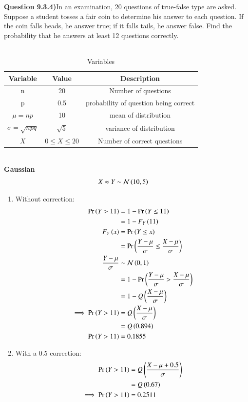 \documentclass[journal,12pt,twocolumn]{IEEEtran}
\theoremstyle{remark}
\begin{document}
\textbf{Question 9.3.4)}In an examination, 20 questions of true-false type are asked. Suppose a student tosses
a fair coin to determine his answer to each question. If the coin falls heads, he answer
true; if it falls tails, he answer false. Find the probability that he answers at least 12
questions correctly.\\
\solution \\
\begin{table}[ht]
    \centering
    \caption{Variables}
    \label{table:random-variables-9.3.4}
\begin{tabular}{|c|c|c|}
\hline
Variable & Value & Description \\
\hline
n & 20 & Number of questions\\
\hline
p & 0.5 & probability of question being correct\\
\hline
$\mu=np$ & 10 & mean of distribution\\
\hline
$\sigma=\sqrt{npq}$ & $\sqrt{5}$ & variance of distribution\\
\hline
$X$ & $0 \le X \le 20$ & Number of correct questions \\
\hline
\end{tabular} 
\end{table}\\
\textbf{Gaussian}\\
\begin{align}
X &\approx Y \sim \mathcal{N}\left(10,5\right)
\end{align}
\begin{enumerate}
\item Without correction:
\begin{align}
\Pr\left(Y > 11\right) &= 1-\Pr\left(Y \le 11\right)\\
&= 1-F_Y\left(11\right)\\
F_Y\left(x\right) &= \Pr\left(Y \le x\right)\\
&= \Pr\left(\frac{Y-\mu}{\sigma} \le \frac{X-\mu}{\sigma}\right)\\
\frac{Y-\mu}{\sigma} &\sim \mathcal{N}\left(0,1\right)\\
&= 1-\Pr\left(\frac{Y-\mu}{\sigma} > \frac{X-\mu}{\sigma}\right)\\
&= 1-Q\left(\frac{X-\mu}{\sigma}\right)\\
\implies \Pr\left(Y > 11\right) &= Q\left(\frac{X-\mu}{\sigma}\right)\\
&= Q\left(0.894\right)\\
\Pr\left(Y > 11\right) &= 0.1855
\end{align}
\item With a 0.5 correction:
\begin{align}
\Pr\left(Y > 11\right) &= Q\left(\frac{X-\mu+0.5}{\sigma}\right)\\
&= Q\left(0.67\right)\\
\implies \Pr\left(Y > 11\right) &= 0.2511
\end{align}
\end{enumerate}
\end{document}
